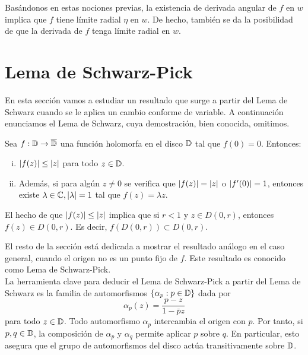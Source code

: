 Basándonos en estas nociones previas, la existencia de derivada angular de $f$ en $w$ implica que $f$ tiene límite radial $\eta$ en $w$. De hecho, también se da la posibilidad de que la derivada de $f$ tenga límite radial en $w$. \\


\section{Lema de Schwarz-Pick}

En esta sección vamos a estudiar un resultado que surge a partir del Lema de Schwarz cuando se le aplica un cambio conforme de variable. A continuación enunciamos el Lema de Schwarz, cuya demostración, bien conocida, omitimos. \\

\begin{theorem}
    Sea $f: \mathbb{D} \to \overline{\mathbb{D}}$ una función holomorfa en el disco $\mathbb{D}$ tal que $f(0) = 0$. Entonces:
    \begin{enumerate}[(i)]
        \item $\left\lvert f(z)\right\rvert \leq \left\lvert z\right\rvert$ para todo $z \in \mathbb{D}$.
        \item Además, si para algún $z \not = 0$ se verifica que $\left\lvert f(z)\right\rvert = \left\lvert z\right\rvert$ o $\left\lvert f'(0)\right\rvert = 1$, entonces existe $\lambda \in \mathbb{C}, \left\lvert\lambda\right\rvert = 1$ tal que $f(z)=\lambda z$.
    \end{enumerate}
\end{theorem}

\begin{obs}
    El hecho de que $\left\lvert f(z)\right\rvert \leq \left\lvert z\right\rvert$ implica que si $r < 1$ y $z \in D(0,r)$, entonces $f(z) \in D(0,r)$. Es decir, $f(D(0,r)) \subset D(0,r)$. \\
\end{obs}

El resto de la sección está dedicada a mostrar el resultado análogo en el caso general, cuando el origen no es un punto fijo de $f$. Este resultado es conocido como Lema de Schwarz-Pick. \\ %

La herramienta clave para deducir el Lema de Schwarz-Pick a partir del Lema de Schwarz es la familia de automorfismos $\{\alpha_p: p\in \mathbb{D}\}$ dada por
\begin{equation*}
    \alpha_p (z) = \frac{p-z}{1 - \bar{p}z}
\end{equation*}
para todo $z \in \mathbb{D}$. Todo automorfismo $\alpha_p$ intercambia el origen con $p$. Por tanto, si $p, q \in \mathbb{D}$, la composición de $\alpha_p$ y $\alpha_q$ permite aplicar $p$ sobre $q$. En particular, esto asegura que el grupo de automorfismos del disco actúa transitivamente sobre $\mathbb{D}$. \\

